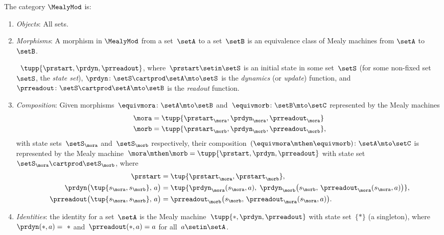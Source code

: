 \begin{ctdefinition}
\label{def:MealyCat}
The category $\MealyMod$ is:
\begin{enumerate}
    \item \emph{Objects}: All sets.
    \item \emph{Morphisms}: A morphism in $\MealyMod$ from a set~$\setA$ to a set~$\setB$ is an equivalence class of Mealy machines from $\setA$ to $\setB$.
    
    ~$\tupp{\prstart, \prdyn, \prreadout}$, where~$\prstart \setin \setS$ is an initial state in some set~$\setS$ (for some non-fixed set~$\setS$, the \emph{state set}), $\prdyn \colon \setS \cartprod \setA \mto \setS$ is the \emph{dynamics} (or \emph{update}) function, and~$\prreadout \colon \setS \cartprod \setA \mto \setB$ is the \emph{readout} function.
    \item \emph{Composition}: Given morphisms~$\equivmora \colon \setA \mto \setB$ and~$\equivmorb\colon \setB \mto \setC$ represented by the Mealy machines
    \begin{equation}
        \begin{aligned}
             & \mora = \tupp{\prstart_\mora, \prdyn_\mora, \prreadout_\mora} \\
             & \morb = \tupp{\prstart_\morb, \prdyn_\morb, \prreadout_\morb},
        \end{aligned}
    \end{equation}
    with state sets~$\setS_\mora$ and~$\setS_\morb$ respectively, their composition~$(\equivmora \mthen \equivmorb)\colon \setA \mto \setC$ is represented by the Mealy machine~$\mora \mthen \morb = \tupp{\prstart, \prdyn, \prreadout}$ with state set~$\setS_\mora \cartprod \setS_\morb$, where
    \begin{equation}
        \begin{aligned}
            \prstart &= \tup{\prstart_\mora, \prstart_\morb}, \\
            \prdyn\bigl(\tup{s_\mora, s_\morb},\, a\bigr) &= \tup{\prdyn_\mora(s_\mora, a),\; \prdyn_\morb\bigl(s_\morb,\, \prreadout_\mora(s_\mora, a)\bigr)}, \\
            \prreadout\bigl(\tup{s_\mora, s_\morb},\, a\bigr) &= \prreadout_\morb\bigl(s_\morb,\, \prreadout_\mora(s_\mora, a)\bigr).
        \end{aligned}
    \end{equation}
    \item \emph{Identities}: the identity for a set~$\setA$ is the Mealy machine~$\tupp{\ast, \prdyn, \prreadout}$ with state set~$\{\ast\}$ (a singleton), where~$\prdyn(\ast, a) = \ \ast$ and~$\prreadout(\ast, a) = a$ for all~$a \setin \setA$.
\end{enumerate}
\end{ctdefinition}



